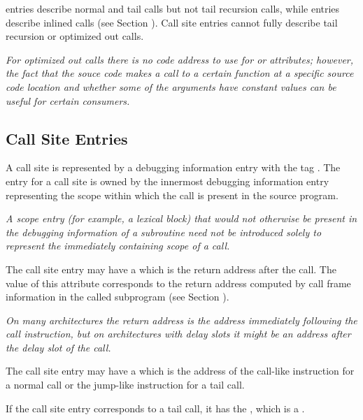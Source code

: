 \DWTAGcallsite{} entries describe normal and tail calls but not tail recursion calls,
while \DWTAGinlinedsubroutine{} entries describe inlined calls
(see Section ).
Call site entries cannot
\bb
fully
\eb
describe tail recursion or optimized out calls.

\bb
\textit{For optimized out calls there is no code address to use for
\DWATcallreturnpc{} or \DWATcallpc{} attributes; however, the fact
that the souce code makes a call to a certain function
at a specific source code location and whether
some of the arguments have constant values can be useful for certain
consumers.}
\eb

\subsection{Call Site Entries}
\label{chap:callsiteentries}
A call site is represented by a debugging information entry with the tag
\DWTAGcallsiteTARG{}.
The entry for a call site is owned by the innermost
debugging information entry representing the scope within which the
call is present in the source program.

\textit{A scope entry (for example, a lexical block) that would not
otherwise be present in the debugging information of a subroutine
need not be introduced solely to represent the immediately containing scope
of a call.}

The call site entry may have a
\DWATcallreturnpcDEFN{}
which is the return address after the call.
The value of this attribute corresponds to the return address
computed by call frame information in the called subprogram
(see Section ).

\textit{On many architectures the return address is the
address immediately following the call instruction, but
on architectures with delay slots it might
be an address after the delay slot of the call.}

The call site entry may have a
\DWATcallpcDEFN{}
which is the address of the
call-like instruction for a normal call or the jump-like
instruction for a tail call.

If the call site entry corresponds to a tail call, it has the
\DWATcalltailcallDEFN{}
,
which is a \CLASSflag.

